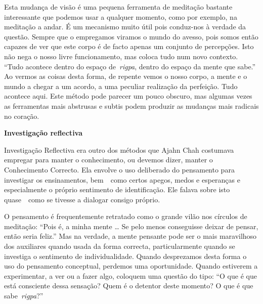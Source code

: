 Esta mudança de visão é uma pequena ferramenta de meditação bastante
interessante que podemos usar a qualquer momento, como por exemplo, na
meditação a andar. É um mecanismo muito útil pois conduz-nos à verdade
da questão. Sempre que o empregamos viramos o mundo do avesso, pois
somos então capazes de ver que este corpo é de facto apenas um conjunto
de percepções. Isto não nega o nosso livre funcionamento, mas coloca
tudo num novo contexto. ``Tudo acontece dentro do espaço
de~\emph{rigpa}, dentro do espaço da mente que sabe.'' Ao vermos as
coisas desta forma, de repente vemos o nosso corpo, a mente e o mundo a
chegar a um acordo, a uma peculiar realização da perfeição. Tudo
acontece aqui. Este método pode parecer um pouco obscuro, mas algumas
vezes as ferramentas mais abstrusas e subtis podem produzir as mudanças
mais radicais no coração.

\textbf{Investigação reflectiva}

Investigação Reflectiva era outro dos métodos que Ajahn Chah costumava
empregar para manter o conhecimento, ou devemos dizer, manter o
Conhecimento Correcto. Ela envolve o uso deliberado do pensamento para
investigar os ensinamentos, bem~~como certos apegos, medos e esperanças
e especialmente o próprio sentimento de identificação. Ele falava sobre
isto quase~~como se tivesse a dialogar consigo próprio.

O pensamento é frequentemente retratado como o grande vilão nos círculos
de meditação: ``Pois é, a minha mente \ldots{} Se pelo menos conseguisse
deixar de pensar, então seria feliz.'' Mas na verdade, a mente pensante
pode ser o mais maravilhoso dos auxiliares quando usada da forma
correcta, particularmente quando se investiga o sentimento de
individualidade. Quando desprezamos desta forma o uso do pensamento
conceptual, perdemos uma oportunidade. Quando estiverem a experimentar,
a ver ou a fazer algo, coloquem uma questão do tipo: ``O que é que está
consciente dessa sensação? Quem é o detentor deste momento? O que é que
sabe~\emph{rigpa}?''

